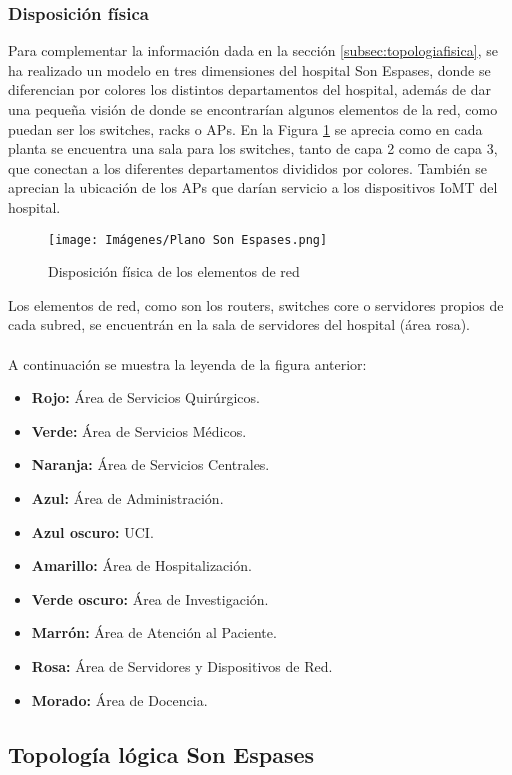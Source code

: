 \subsubsection{Disposición física}
Para complementar la información dada en la sección \ref{subsec:topologiafisica}, se ha realizado un modelo en tres dimensiones del hospital Son Espases, donde se diferencian por colores 
los distintos departamentos del hospital, además de dar una pequeña visión de donde se encontrarían algunos elementos de la red, como puedan ser los switches, racks o APs.
En la Figura \ref{fig:disposic} se aprecia como en cada planta se encuentra una sala para los switches, tanto de capa 2 como de capa 3, que conectan a los diferentes departamentos divididos por colores. También se 
aprecian la ubicación de los APs que darían servicio a los dispositivos IoMT del hospital. 
\begin{figure}[H]
    \centering
    \texttt{[image: Imágenes/Plano Son Espases.png]}
    \caption{Disposición física de los elementos de red}
    \label{fig:disposic} 
\end{figure}
Los elementos de red, como son los routers, switches core o servidores propios de cada subred, se encuentrán en la sala de servidores del hospital (área rosa).
\\ \\
A continuación se muestra la leyenda de la figura anterior:
\begin{itemize}
    \item \textbf{Rojo:} Área de Servicios Quirúrgicos.
    \item \textbf{Verde:} Área de Servicios Médicos.
    \item \textbf{Naranja:} Área de Servicios Centrales.
    \item \textbf{Azul:} Área de Administración.
    \item \textbf{Azul oscuro:} UCI.
    \item \textbf{Amarillo:} Área de Hospitalización.
    \item \textbf{Verde oscuro:} Área de Investigación.
    \item \textbf{Marrón:} Área de Atención al Paciente.
    \item \textbf{Rosa:} Área de Servidores y Dispositivos de Red.
    \item \textbf{Morado:} Área de Docencia.
\end{itemize}
\subsection{Topología lógica Son Espases}

